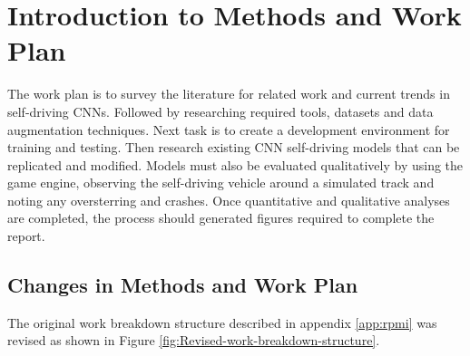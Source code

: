 
\section{Introduction to Methods and Work Plan}


The work plan is to survey the literature for related work and current trends in self-driving CNNs. Followed by researching required tools, datasets and data augmentation techniques. Next task is to create a development environment for training and testing. Then research existing CNN self-driving models that can be replicated and modified. 
Models must also be evaluated qualitatively by using the game engine, observing the self-driving vehicle around a simulated track and noting any oversterring and crashes. Once quantitative and qualitative analyses are completed, the process should generated figures required to complete the report. 


\subsection{Changes in Methods and Work Plan}


 



The original work breakdown structure described in appendix \ref{app:rpmi} was revised as shown in Figure \ref{fig:Revised-work-breakdown-structure}. 

